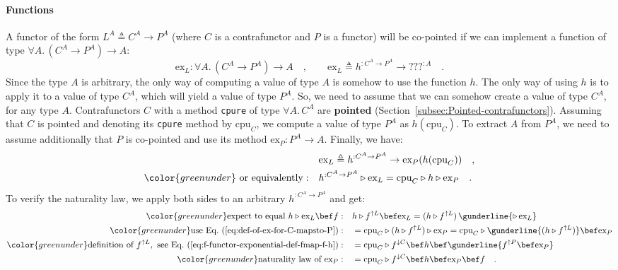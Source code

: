 \paragraph{Functions}

A functor of the form $L^{A}\triangleq C^{A}\rightarrow P^{A}$ (where
$C$ is a contrafunctor and $P$ is a functor) will be co-pointed
if we can implement a function of type $\forall A.\,(C^{A}\rightarrow P^{A})\rightarrow A$:
\[
\text{ex}_{L}:\forall A.\,(C^{A}\rightarrow P^{A})\rightarrow A\quad,\quad\quad\text{ex}_{L}\triangleq h^{:C^{A}\rightarrow P^{A}}\rightarrow\text{???}^{:A}\quad.
\]
Since the type $A$ is arbitrary, the only way of computing a value
of type $A$ is somehow to use the function $h$. The only way of
using $h$ is to apply it to a value of type $C^{A}$, which will
yield a value of type $P^{A}$. So, we need to assume that we can
somehow create a value of type $C^{A}$, for any type $A$. Contrafunctors
$C$ with a method \lstinline!cpure! of type $\forall A.\,C^{A}$
are \textbf{pointed} (Section~\ref{subsec:Pointed-contrafunctors}).
Assuming that $C$ is pointed and denoting its \lstinline!cpure!
method by $\text{cpu}_{C}$, we compute a value of type $P^{A}$ as
$h(\text{cpu}_{C})$. To extract $A$ from $P^{A}$, we need to assume
additionally that $P$ is co-pointed and use its method $\text{ex}_{P}:P^{A}\rightarrow A$.
Finally, we have:
\begin{align}
 & \text{ex}_{L}\triangleq h^{:C^{A}\rightarrow P^{A}}\rightarrow\text{ex}_{P}(h(\text{cpu}_{C}))\quad,\label{eq:def-of-ex-for-C-mapsto-P}\\
{\color{greenunder}\text{ or equivalently}:}\quad & h^{:C^{A}\rightarrow P^{A}}\triangleright\text{ex}_{L}=\text{cpu}_{C}\triangleright h\triangleright\text{ex}_{P}\quad.\nonumber 
\end{align}
To verify the naturality law, we apply both sides to an arbitrary
$h^{:C^{A}\rightarrow P^{A}}$ and get:
\begin{align*}
{\color{greenunder}\text{expect to equal }h\triangleright\text{ex}_{L}\bef f:}\quad & h\triangleright f^{\uparrow L}\bef\text{ex}_{L}=(h\triangleright f^{\uparrow L})\,\gunderline{\triangleright\,\text{ex}_{L}}\\
{\color{greenunder}\text{use Eq.~(\ref{eq:def-of-ex-for-C-mapsto-P})}:}\quad & =\text{cpu}_{C}\triangleright(h\triangleright f^{\uparrow L})\triangleright\text{ex}_{P}=\text{cpu}_{C}\triangleright\gunderline{(h\triangleright f^{\uparrow L})}\bef\text{ex}_{P}\\
{\color{greenunder}\text{definition of }f^{\uparrow L},\text{ see Eq.~(\ref{eq:f-functor-exponential-def-fmap-f-h})}:}\quad & =\text{cpu}_{C}\triangleright f^{\downarrow C}\bef h\bef\gunderline{f^{\uparrow P}\bef\text{ex}_{P}}\\
{\color{greenunder}\text{naturality law of }\text{ex}_{P}:}\quad & =\text{cpu}_{C}\triangleright f^{\downarrow C}\bef h\bef\text{ex}_{P}\bef f\quad.
\end{align*}
